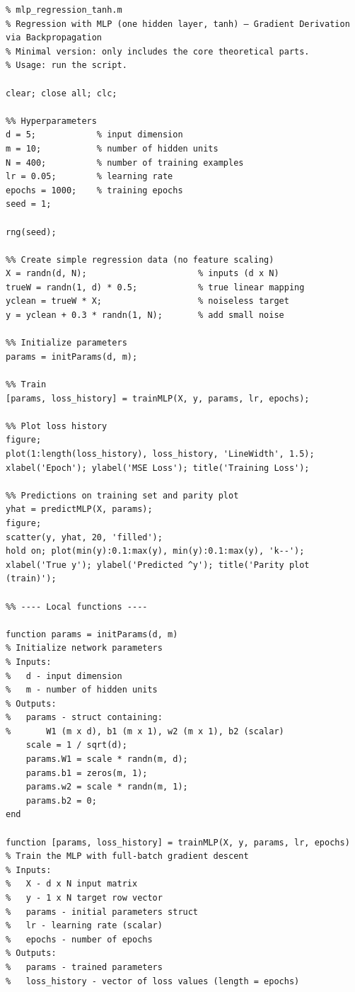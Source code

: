 \documentclass[11pt,a4paper]{article}
\begin{document}
\begin{verbatim}
% mlp_regression_tanh.m
% Regression with MLP (one hidden layer, tanh) — Gradient Derivation via Backpropagation
% Minimal version: only includes the core theoretical parts.
% Usage: run the script.

clear; close all; clc;

%% Hyperparameters
d = 5;            % input dimension
m = 10;           % number of hidden units
N = 400;          % number of training examples
lr = 0.05;        % learning rate
epochs = 1000;    % training epochs
seed = 1;

rng(seed);

%% Create simple regression data (no feature scaling)
X = randn(d, N);                      % inputs (d x N)
trueW = randn(1, d) * 0.5;            % true linear mapping
yclean = trueW * X;                   % noiseless target
y = yclean + 0.3 * randn(1, N);       % add small noise

%% Initialize parameters
params = initParams(d, m);

%% Train
[params, loss_history] = trainMLP(X, y, params, lr, epochs);

%% Plot loss history
figure;
plot(1:length(loss_history), loss_history, 'LineWidth', 1.5);
xlabel('Epoch'); ylabel('MSE Loss'); title('Training Loss');

%% Predictions on training set and parity plot
yhat = predictMLP(X, params);
figure;
scatter(y, yhat, 20, 'filled');
hold on; plot(min(y):0.1:max(y), min(y):0.1:max(y), 'k--');
xlabel('True y'); ylabel('Predicted ^y'); title('Parity plot (train)');

%% ---- Local functions ----

function params = initParams(d, m)
% Initialize network parameters
% Inputs:
%   d - input dimension
%   m - number of hidden units
% Outputs:
%   params - struct containing:
%       W1 (m x d), b1 (m x 1), w2 (m x 1), b2 (scalar)
    scale = 1 / sqrt(d);
    params.W1 = scale * randn(m, d);
    params.b1 = zeros(m, 1);
    params.w2 = scale * randn(m, 1);
    params.b2 = 0;
end

function [params, loss_history] = trainMLP(X, y, params, lr, epochs)
% Train the MLP with full-batch gradient descent
% Inputs:
%   X - d x N input matrix
%   y - 1 x N target row vector
%   params - initial parameters struct
%   lr - learning rate (scalar)
%   epochs - number of epochs
% Outputs:
%   params - trained parameters
%   loss_history - vector of loss values (length = epochs)


\end{verbatim}
\end{document}
